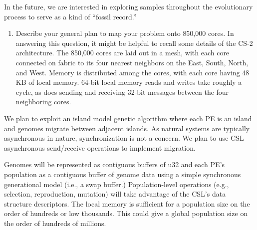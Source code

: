In the future, we are interested in exploring samples throughout the evolutionary process to serve as a kind of ``fossil record.''

\begin{enumerate}[resume] \itshape
\item Describe your general plan to map your problem onto 850,000 cores. In answering this question, it might be helpful to recall some details of the CS-2 architecture.
The 850,000 cores are laid out in a mesh, with each core connected on fabric to its four nearest neighbors on the East, South, North, and West.
Memory is distributed among the cores, with each core having 48 KB of local memory.
64-bit local memory reads and writes take roughly a cycle, as does sending and receiving 32-bit messages between the four neighboring cores.
\end{enumerate}

We plan to exploit an island model genetic algorithm where each PE is an island and genomes migrate between adjacent islands.
As natural systems are typically asynchronous in nature, synchronization is not a concern.
We plan to use CSL asynchronous send/receive operations to implement migration.

Genomes will be represented as contiguous buffers of u32 and each PE's population as a contiguous buffer of genome data using a simple synchronous generational model (i.e., a swap buffer.)
Population-level operations (e.g., selection, reproduction, mutation) will take advantage of the CSL's data structure descriptors.
The local memory is sufficient for a population size on the order of hundreds or low thousands.
This could give a global population size on the order of hundreds of millions.
